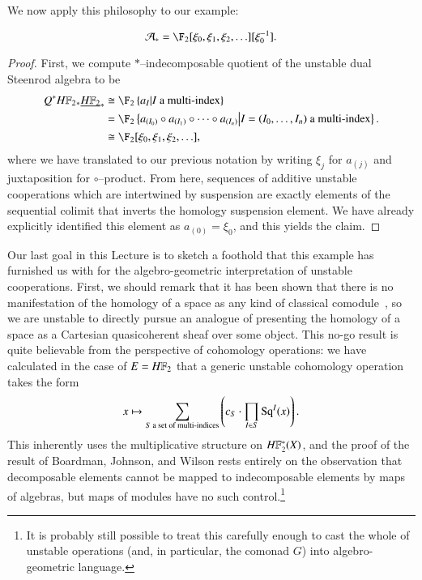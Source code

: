 We now apply this philosophy to our example:
\begin{corollary}\label{StarIndecompsInUDualSteenrodAlg}
\[\mathcal A_* = \F_2[\xi_0, \xi_1, \xi_2, \ldots][\xi_0^{-1}].\]
\end{corollary}
\begin{proof}
First, we compute $\ast$--indecomposable quotient of the unstable dual Steenrod algebra to be
\begin{align*}
Q^\ast \HFtwo_* \OS{\HFtwo}{*} & \cong \F_2\left\{a_{I} \middle| \text{$I$ a multi-index}\right\} \\
& = \F_2\left\{ a_{(I_0)} \circ a_{(I_1)} \circ \cdots \circ a_{(I_n)} \middle| \text{$I = (I_0, \ldots, I_n)$ a multi-index}\right\}. \\
& \cong \F_2[\xi_0, \xi_1, \xi_2, \ldots],
\end{align*}
where we have translated to our previous notation by writing $\xi_j$ for $a_{(j)}$ and juxtaposition for $\circ$--product.  From here, sequences of additive unstable cooperations which are intertwined by suspension are exactly elements of the sequential colimit that inverts the homology suspension element.  We have already explicitly identified this element as $a_{(0)} = \xi_0$, and this yields the claim.
\end{proof}

Our last goal in this Lecture is to sketch a foothold that this example has furnished us with for the algebro-geometric interpretation of unstable cooperations.  First, we should remark that it has been shown that there is no manifestation of the homology of a space as any kind of classical comodule~\cite[Theorem 9.4]{BJW}, so we are unstable to directly pursue an analogue of  presenting the homology of a space as a Cartesian quasicoherent sheaf over some object.  This no-go result is quite believable from the perspective of cohomology operations: we have calculated in the case of $E = \HFtwo$ that a generic unstable cohomology operation takes the form \[x \mapsto \sum_{\text{$S$ a set of multi-indices}} \left(c_S \cdot \prod_{I \in S} \operatorname{Sq}^I(x)\right).\]  This inherently uses the multiplicative structure on $\HFtwo^*(X)$, and the proof of the result of Boardman, Johnson, and Wilson rests entirely on the observation that decomposable elements cannot be mapped to indecomposable elements by maps of algebras, but maps of modules have no such control.\footnote{It is probably still possible to treat this carefully enough to cast the whole of unstable operations (and, in particular, the comonad $G$) into algebro-geometric language.}

